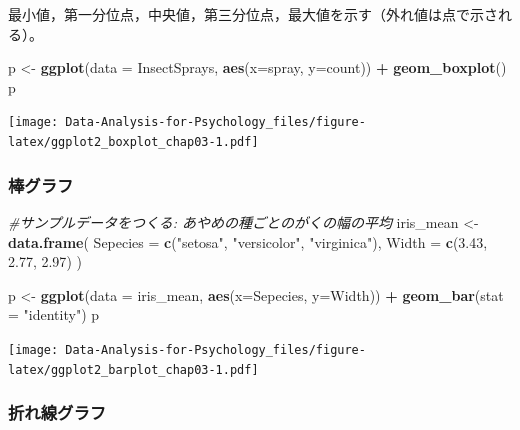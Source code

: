 \documentclass[]{article}
\newenvironment{Shaded}{\begin{snugshade}}{\end{snugshade}}
\newcommand{\KeywordTok}[1]{\textcolor[rgb]{0.13,0.29,0.53}{\textbf{#1}}}
\newcommand{\DataTypeTok}[1]{\textcolor[rgb]{0.13,0.29,0.53}{#1}}
\newcommand{\FloatTok}[1]{\textcolor[rgb]{0.00,0.00,0.81}{#1}}
\newcommand{\StringTok}[1]{\textcolor[rgb]{0.31,0.60,0.02}{#1}}
\newcommand{\CommentTok}[1]{\textcolor[rgb]{0.56,0.35,0.01}{\textit{#1}}}
\newcommand{\OperatorTok}[1]{\textcolor[rgb]{0.81,0.36,0.00}{\textbf{#1}}}
\newcommand{\NormalTok}[1]{#1}
\begin{document}
最小値，第一分位点，中央値，第三分位点，最大値を示す（外れ値は点で示される）。

\begin{Shaded}
\begin{Highlighting}[]
\NormalTok{p <-}\StringTok{ }\KeywordTok{ggplot}\NormalTok{(}\DataTypeTok{data =}\NormalTok{ InsectSprays, }\KeywordTok{aes}\NormalTok{(}\DataTypeTok{x=}\NormalTok{spray, }\DataTypeTok{y=}\NormalTok{count)) }\OperatorTok{+}\StringTok{ }
\StringTok{      }\KeywordTok{geom_boxplot}\NormalTok{()}
\NormalTok{p}
\end{Highlighting}
\end{Shaded}

\texttt{[image: Data-Analysis-for-Psychology\_files/figure-latex/ggplot2\_boxplot\_chap03-1.pdf]}

\subsubsection{棒グラフ}

\begin{Shaded}
\begin{Highlighting}[]
\CommentTok{#サンプルデータをつくる: あやめの種ごとのがくの幅の平均}
\NormalTok{iris_mean <-}\StringTok{ }\KeywordTok{data.frame}\NormalTok{(}
    \DataTypeTok{Sepecies  =} \KeywordTok{c}\NormalTok{(}\StringTok{"setosa"}\NormalTok{, }\StringTok{"versicolor"}\NormalTok{, }\StringTok{"virginica"}\NormalTok{), }
    \DataTypeTok{Width =} \KeywordTok{c}\NormalTok{(}\FloatTok{3.43}\NormalTok{, }\FloatTok{2.77}\NormalTok{, }\FloatTok{2.97}\NormalTok{)}
\NormalTok{)}

\NormalTok{p <-}\StringTok{ }\KeywordTok{ggplot}\NormalTok{(}\DataTypeTok{data =}\NormalTok{ iris_mean, }\KeywordTok{aes}\NormalTok{(}\DataTypeTok{x=}\NormalTok{Sepecies, }\DataTypeTok{y=}\NormalTok{Width)) }\OperatorTok{+}\StringTok{ }
\StringTok{      }\KeywordTok{geom_bar}\NormalTok{(}\DataTypeTok{stat =} \StringTok{"identity"}\NormalTok{)}
\NormalTok{p}
\end{Highlighting}
\end{Shaded}

\texttt{[image: Data-Analysis-for-Psychology\_files/figure-latex/ggplot2\_barplot\_chap03-1.pdf]}

\subsubsection{折れ線グラフ}
\end{document}
